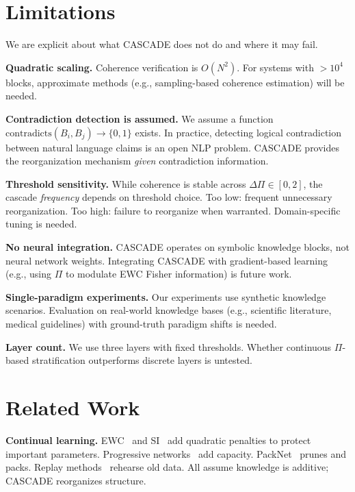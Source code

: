 \documentclass[11pt,a4paper]{article}
\theoremstyle{definition}
\newcommand{\tp}{\Pi}
\begin{document}
\section{Limitations}\label{sec:limitations}

We are explicit about what CASCADE does not do and where it may fail.

\textbf{Quadratic scaling.} Coherence verification is $O(N^2)$. For systems with $> 10^4$ blocks, approximate methods (e.g., sampling-based coherence estimation) will be needed.

\textbf{Contradiction detection is assumed.} We assume a function $\text{contradicts}(B_i, B_j) \to \{0, 1\}$ exists. In practice, detecting logical contradiction between natural language claims is an open NLP problem. CASCADE provides the reorganization mechanism \emph{given} contradiction information.

\textbf{Threshold sensitivity.} While coherence is stable across $\Delta\tp \in [0, 2]$, the cascade \emph{frequency} depends on threshold choice. Too low: frequent unnecessary reorganization. Too high: failure to reorganize when warranted. Domain-specific tuning is needed.

\textbf{No neural integration.} CASCADE operates on symbolic knowledge blocks, not neural network weights. Integrating CASCADE with gradient-based learning (e.g., using $\tp$ to modulate EWC Fisher information) is future work.

\textbf{Single-paradigm experiments.} Our experiments use synthetic knowledge scenarios. Evaluation on real-world knowledge bases (e.g., scientific literature, medical guidelines) with ground-truth paradigm shifts is needed.

\textbf{Layer count.} We use three layers with fixed thresholds. Whether continuous $\tp$-based stratification outperforms discrete layers is untested.

\section{Related Work}\label{sec:related}

\textbf{Continual learning.} EWC~\citep{kirkpatrick2017overcoming} and SI~\citep{zenke2017continual} add quadratic penalties to protect important parameters. Progressive networks~\citep{rusu2016progressive} add capacity. PackNet~\citep{mallya2018packnet} prunes and packs. Replay methods~\citep{chaudhry2019tiny,shin2017continual} rehearse old data. All assume knowledge is additive; CASCADE reorganizes structure.
\end{document}
